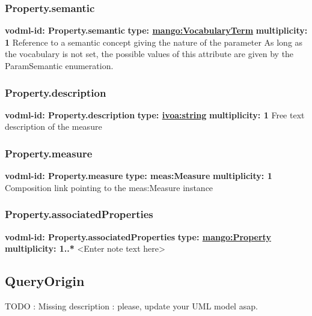     \subsubsection{Property.semantic}
      \textbf{vodml-id: Property.semantic} \newline
      \textbf{type: \hyperref[sect:VocabularyTerm]{mango:VocabularyTerm}} \newline
      \textbf{multiplicity: 1} \newline
      Reference to a semantic concept giving the nature of the parameter As long as the vocabulary is not set, the possible values of this attribute are given by the ParamSemantic enumeration.

    \subsubsection{Property.description}
      \textbf{vodml-id: Property.description} \newline
      \textbf{type: \hyperref[sect:ivoa]{ivoa:string}} \newline
      \textbf{multiplicity: 1} \newline
      Free text description of the measure

    \subsubsection{Property.measure}
      \textbf{vodml-id: Property.measure} \newline
      \textbf{type: meas:Measure} \newline
      \textbf{multiplicity: 1} \newline
      Composition link pointing to the meas:Measure instance

    \subsubsection{Property.associatedProperties}
      \textbf{vodml-id: Property.associatedProperties} \newline
      \textbf{type: \hyperref[sect:Property]{mango:Property}} \newline
      \textbf{multiplicity: 1..*} \newline
      <Enter note text here>

  \subsection{QueryOrigin}
  \label{sect:QueryOrigin}
    TODO : Missing description : please, update your UML model asap.

